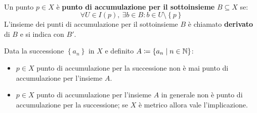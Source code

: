 \begin{define}~{}\\
	Un punto $p\in X$ è \textbf{punto di accumulazione per il sottoinsieme} $B\subseteq X$ se:
	\begin{equation}
		\forall U\in I\left(p\right),\ \exists b\in B \colon b\in U\setminus \left\{ p\right\}
	\end{equation}
L'insieme dei punti di accumulazione per il sottoinsieme $B$ è chiamato \textbf{derivato} di $B$ e si indica con $B'$.
\end{define}
\begin{exercise}
Data la successione $\left\{a_n\right\}$ in $X$ e definito $A\coloneqq \{a_n\mid n\in\mathbb{N}\}$:
\begin{itemize}
\item $p\in X$ punto di accumulazione per la successione non è mai punto di accumulazione per l'insieme $A$.
\item $p\in X$ punto di accumulazione per l'insieme $A$ in generale non è punto di accumulazione per la successione; se $X$ è metrico allora vale l'implicazione.
\end{itemize}
\vspace{-3mm}
\end{exercise}
